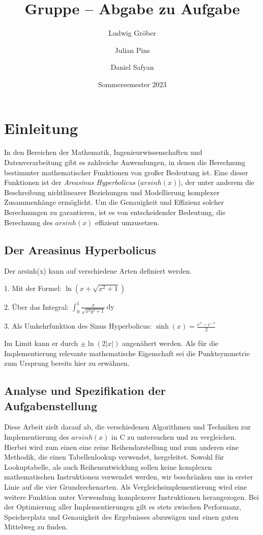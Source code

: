\documentclass[course=erap] {aspdoc}
\author{Ludwig Gröber \and Julian Pins \and Daniel Safyan}
\date{Sommersemester 2023} %
\title{Gruppe \theGroup{} -- Abgabe zu Aufgabe \theNumber}
\begin{document}
    \maketitle


    \section{Einleitung}
    In den Bereichen der Mathematik, Ingenieurwissenschaften und Datenverarbeitung gibt es zahlreiche Anwendungen, in denen die Berechnung bestimmter mathematischer Funktionen von großer Bedeutung ist. Eine dieser Funktionen ist der \textit{Areasinus Hyperbolicus} ($arsinh(x)$), der unter anderem die Beschreibung nichtlinearer Beziehungen und Modellierung komplexer Zusammenhänge ermöglicht. Um die Genauigkeit und Effizienz solcher Berechnungen zu garantieren, ist es von entscheidender Bedeutung, die Berechnung des $arsinh(x)$ effizient umzusetzen.  

    \subsection{Der Areasinus Hyperbolicus}
    Der arsinh(x) kann auf verschiedene Arten definiert werden.

     1. Mit der Formel: $\ln \left(x + \sqrt{x^2 + 1} \right)$

     
    2. Über das Integral: $\int_{0}^{1} {\frac{x}{\sqrt{x^2 y^2 + 1}} \,\mathrm{dy}}$

    
    3. Als Umkehrfunktion des Sinus Hyperbolicus:  $\operatorname{sinh}(x) = \frac{e^x-e^{-x}}{2}$
    
    Im Limit kann er durch $\pm \ln(2|x|)$ angenähert werden.
    Als für die Implementierung relevante mathematische Eigenschaft sei die Punktsymmetrie zum Ursprung bereits hier zu erwähnen. 



    \subsection{Analyse und Spezifikation der Aufgabenstellung}
    Diese Arbeit zielt darauf ab, die verschiedenen Algorithmen und Techniken zur Implementierung des $arsinh(x)$ in C zu untersuchen und zu vergleichen. Hierbei wird zum einen eine reine Reihendarstellung und zum anderen eine Methodik, die einen Tabellenlookup verwendet, hergeleitet.  Sowohl für Lookuptabelle, als auch Reihenentwicklung sollen keine komplexen mathematischen Instruktionen verwendet werden, wir beschränken uns in erster Linie auf die vier Grundrechenarten. Als Vergleichsimplementierung wird eine weitere Funktion unter Verwendung komplexerer Instruktionen herangezogen. 
    Bei der Optimierung aller Implementierungen gilt es stets zwischen Performanz, Speicherplatz und Genauigkeit des Ergebnisses abzuwägen und einen guten Mittelweg zu finden.
   
\end{document}
